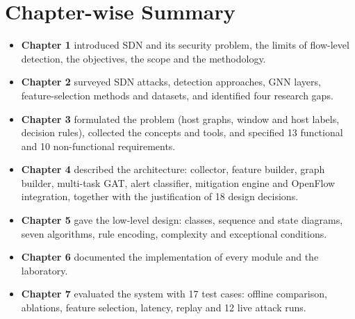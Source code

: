 \section{Chapter-wise Summary}
\begin{itemize}
	\item \textbf{Chapter 1} introduced SDN and its security problem, the limits of flow-level detection, the objectives, the scope and the methodology.
	\item \textbf{Chapter 2} surveyed SDN attacks, detection approaches, GNN layers, feature-selection methods and datasets, and identified four research gaps.
	\item \textbf{Chapter 3} formulated the problem (host graphs, window and host labels, decision rules), collected the concepts and tools, and specified 13 functional and 10 non-functional requirements.
	\item \textbf{Chapter 4} described the architecture: collector, feature builder, graph builder, multi-task GAT, alert classifier, mitigation engine and OpenFlow integration, together with the justification of 18 design decisions.
	\item \textbf{Chapter 5} gave the low-level design: classes, sequence and state diagrams, seven algorithms, rule encoding, complexity and exceptional conditions.
	\item \textbf{Chapter 6} documented the implementation of every module and the laboratory.
	\item \textbf{Chapter 7} evaluated the system with 17 test cases: offline comparison, ablations, feature selection, latency, replay and 12 live attack runs.
\end{itemize}

